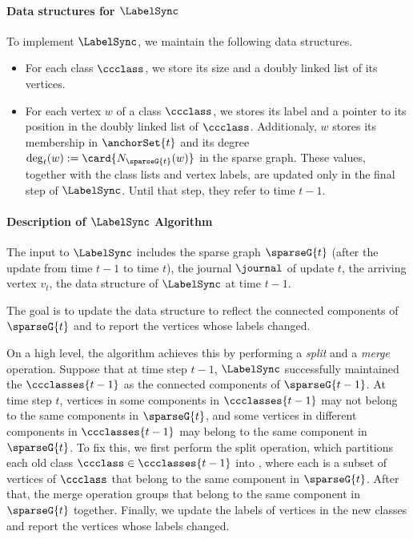 \paragraph{Data structures for \texorpdfstring{$ \LabelSync $}{LabelSync}}\label{par:data_structure_of_labelsync}
To implement $ \LabelSync $, we maintain the following data structures.
\begin{itemize}
    \item For each class $ \ccclass $, we store its size and a doubly linked list of its vertices.
    \item For each vertex $ w $ of a class $ \ccclass $, we stores its label and a pointer to its position in the doubly linked list of $ \ccclass $. Additionaly, $ w $ stores its membership in $ \anchorSet{t} $ and its degree $ \deg_t(w):=\card{\openN{\sparseG{t}}{w}} $ in the sparse graph.
    These values, together with the class lists and vertex labels, are updated only in the final step of $ \LabelSync $.
    Until that step, they refer to time $ t-1 $.
\end{itemize}

\paragraph{Description of \texorpdfstring{$ \LabelSync $}{LabelSync} Algorithm}\label{par:description_of_texorpdfstring_labelsync_labelsync_algorithm} %
The input to $ \LabelSync $ includes the sparse graph $ \sparseG{t} $ (after the update from time $ t-1 $ to time $ t $), the journal $ \journal $ of update $ t $, the arriving vertex $ v_t $, the data structure of $ \LabelSync $ at time $ t-1 $.

The goal is to update the data structure to reflect the connected components of $ \sparseG{t} $ and to report the vertices whose labels changed.

On a high level, the algorithm achieves this by performing a \emph{split} and a \emph{merge} operation. Suppose that at time step $ t-1 $, $ \LabelSync $ successfully maintained the $ \ccclasses{t-1} $ as the connected components of $ \sparseG{t-1} $. At time step $ t $, vertices in some components in $ \ccclasses{t-1} $ may not belong to the same components in $ \sparseG{t} $, and some vertices in different components in $ \ccclasses{t-1} $ may belong to the same component in $ \sparseG{t} $. To fix this, we first perform the split operation, which partitions each old class $ \ccclass \in \ccclasses{t-1} $ into , where each \piece{} is a subset of vertices of $ \ccclass $ that belong to the same component in $ \sparseG{t} $. After that, the merge operation groups  that belong to the same component in $ \sparseG{t} $ together. Finally, we update the labels of vertices in the new classes and report the vertices whose labels changed.


